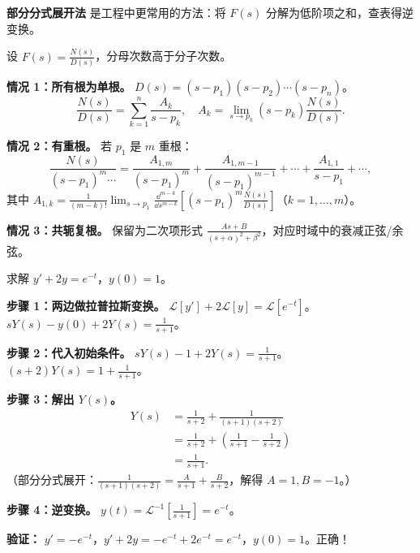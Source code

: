 \textbf{部分分式展开法} 是工程中更常用的方法：将 $F(s)$ 分解为低阶项之和，查表得逆变换。

\begin{example}[部分分式展开的通用方法]
设 $F(s) = \frac{N(s)}{D(s)}$，分母次数高于分子次数。

\textbf{情况 1：所有根为单根。}
$D(s) = (s-p_1)(s-p_2)\cdots(s-p_n)$。
\begin{equation}
\frac{N(s)}{D(s)} = \sum_{k=1}^n \frac{A_k}{s-p_k},\quad
A_k = \lim_{s\to p_k} (s-p_k)\frac{N(s)}{D(s)}.
\end{equation}

\textbf{情况 2：有重根。}
若 $p_1$ 是 $m$ 重根：
\begin{equation}
\frac{N(s)}{(s-p_1)^m\cdots} = \frac{A_{1,m}}{(s-p_1)^m} + \frac{A_{1,m-1}}{(s-p_1)^{m-1}} + \cdots + \frac{A_{1,1}}{s-p_1} + \cdots,
\end{equation}
其中 $A_{1,k} = \frac{1}{(m-k)!}\lim_{s\to p_1}\frac{\dd^{m-k}}{\dd s^{m-k}}\left[(s-p_1)^m\frac{N(s)}{D(s)}\right]$（$k=1,\dots,m$）。

\textbf{情况 3：共轭复根。}
保留为二次项形式 $\frac{As+B}{(s+\alpha)^2+\beta^2}$，对应时域中的衰减正弦/余弦。
\end{example}

\begin{example}
求解 $y' + 2y = e^{-t}$，$y(0)=1$。

\textbf{步骤 1：两边做拉普拉斯变换。}
$\mathcal{L}[y'] + 2\mathcal{L}[y] = \mathcal{L}[e^{-t}]$。
$sY(s) - y(0) + 2Y(s) = \frac{1}{s+1}$。

\textbf{步骤 2：代入初始条件。}
$sY(s) - 1 + 2Y(s) = \frac{1}{s+1}$。
$(s+2)Y(s) = 1 + \frac{1}{s+1}$。

\textbf{步骤 3：解出 $Y(s)$。}
\begin{align*}
Y(s) &= \frac{1}{s+2} + \frac{1}{(s+1)(s+2)} \\
&= \frac{1}{s+2} + \left(\frac{1}{s+1} - \frac{1}{s+2}\right) \\
&= \frac{1}{s+1}.
\end{align*}
（部分分式展开：$\frac{1}{(s+1)(s+2)} = \frac{A}{s+1} + \frac{B}{s+2}$，解得 $A=1,B=-1$。）

\textbf{步骤 4：逆变换。}
$y(t) = \mathcal{L}^{-1}\left[\frac{1}{s+1}\right] = e^{-t}$。

\textbf{验证：} $y' = -e^{-t}$，$y'+2y = -e^{-t}+2e^{-t}=e^{-t}$，$y(0)=1$。正确！
\end{example}

